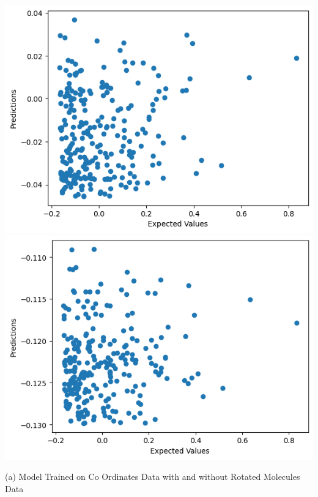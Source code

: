\documentclass{article}
\begin{document}
\includegraphics[scale=0.5]{../images/cord_rot.png}
\includegraphics[scale=0.5]{../images/cord_unrot.png}
\begin{center} (a) Model Trained on Co Ordinates Data with and without Rotated Molecules Data \end{center}
\end{document}
